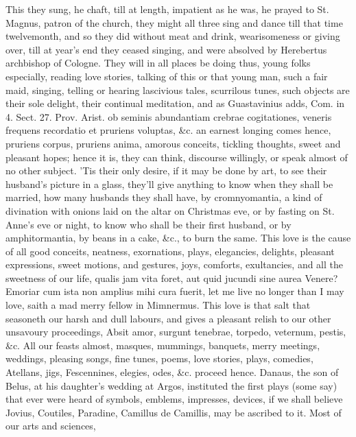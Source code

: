 {This they sung, he chaft, till at length, impatient as he was, he
prayed to St. Magnus, patron of the church, they might all three sing
and dance till that time twelvemonth, and so they did without
meat and drink, wearisomeness or giving over, till at year's end they
ceased singing, and were absolved by Herebertus archbishop of Cologne.
They will in all places be doing thus, young folks especially, reading
love stories, talking of this or that young man, such a fair maid,
singing, telling or hearing lascivious tales, scurrilous tunes, such
objects are their sole delight, their continual meditation, and as
Guastavinius adds, Com. in 4. Sect. 27. Prov. Arist. ob seminis
abundantiam crebrae cogitationes, veneris frequens recordatio et
pruriens voluptas, \&c. an earnest longing comes hence, pruriens corpus,
pruriens anima, amorous conceits, tickling thoughts, sweet and pleasant
hopes; hence it is, they can think, discourse willingly, or speak
almost of no other subject. 'Tis their only desire, if it may be done
by art, to see their husband's picture in a glass, they'll give
anything to know when they shall be married, how many husbands they
shall have, by cromnyomantia, a kind of divination with onions
laid on the altar on Christmas eve, or by fasting on St. Anne's eve or
night, to know who shall be their first husband, or by amphitormantia,
by beans in a cake, \&c., to burn the same. This love is the cause of
all good conceits,  neatness, exornations, plays, elegancies,
delights, pleasant expressions, sweet motions, and gestures, joys,
comforts, exultancies, and all the sweetness of our life, qualis
jam vita foret, aut quid jucundi sine aurea Venere? Emoriar cum
ista non amplius mihi cura fuerit, let me live no longer than I may
love, saith a mad merry fellow in Mimnermus. This love is that salt
that seasoneth our harsh and dull labours, and gives a pleasant relish
to our other unsavoury proceedings, Absit amor, surgunt tenebrae,
torpedo, veternum, pestis, \&c. All our feasts almost, masques,
mummings, banquets, merry meetings, weddings, pleasing songs, fine
tunes, poems, love stories, plays, comedies, Atellans, jigs,
Fescennines, elegies, odes, \&c. proceed hence. Danaus, the son of
Belus, at his daughter's wedding at Argos, instituted the first plays
(some say) that ever were heard of symbols, emblems, impresses,
devices, if we shall believe Jovius, Coutiles, Paradine, Camillus de
Camillis, may be ascribed to it. Most of our arts and sciences,
}
